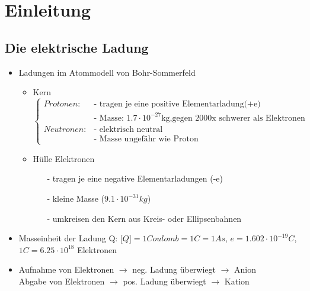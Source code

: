 \section{Einleitung}
\subsection{Die elektrische Ladung}

\begin{itemize}
	\item Ladungen im Atommodell von Bohr-Sommerfeld\\
	\begin{itemize}
			\item Kern 
			$\begin{cases}
				Protonen:  & \text{- tragen je eine positive Elementarladung(+e)}\\ & \text{- Masse: $1.7 \cdot 10^{-27}$kg,gegen 2000x schwerer als 					
				Elektronen}\\
				Neutronen: & \text{- elektrisch neutral}\\ & \text{- Masse ungefähr wie Proton}
			\end{cases}$\\
			\item Hülle Elektronen
			\begin{itemize}
				\item[-] tragen je eine negative Elementarladungen (-e)\\
				\item[-] kleine Masse ($9.1 \cdot 10^{-31}kg$)\\
				\item[-] umkreisen den Kern aus Kreis- oder Ellipsenbahnen\\
			\end{itemize}
		\end{itemize}
	\item Masseinheit der Ladung Q: $ \lbrack Q \rbrack = 1 Coulomb = 1 C = 1 As$, $ e = 1.602\cdot 10^{-19} C$, $1 C = 6.25\cdot 10^{18}$ Elektronen
	\item Aufnahme von Elektronen $\rightarrow$ neg. Ladung überwiegt $\rightarrow$ Anion\\
		Abgabe von Elektronen $\rightarrow$ pos. Ladung überwiegt $\rightarrow$ Kation\\
	
\end{itemize}

